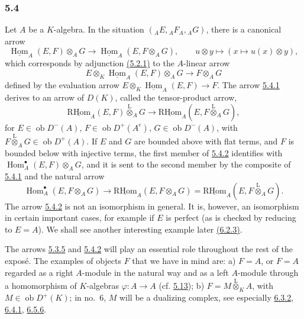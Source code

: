 \documentclass[11pt]{article}
\providecommand{\uHom}{\underline{\Hom}}
\providecommand{\uRHom}{\underline{\RHom}}
\DeclareMathOperator{\Hom}{Hom}
\newcommand{\ob}{\operatorname{ob}}
\providecommand{\RHom}{\mathrm{RHom}}
\providecommand{\lten}{\overset{\mathrm L}{\otimes}}
\providecommand{\RHom}{\mathrm{RHom}}
\providecommand{\Hom}{\operatorname{Hom}}
\providecommand{\ob}{\operatorname{ob}}
\providecommand{\lten}{\overset{\mathrm L}{\otimes}}
\providecommand{\RHom}{\mathrm R\mathcal{H}om}
\providecommand{\lten}{\overset{\mathrm L}{\otimes}}
\providecommand{\lten}{\overset{\mathrm L}{\otimes}}
\providecommand{\lten}{\overset{\mathrm L}{\otimes}}
\providecommand{\lten}{\overset{\mathrm L}{\otimes}}
\providecommand{\RHom}{\mathrm{RHom}}
\providecommand{\Hom}{\operatorname{Hom}}
\providecommand{\lten}{\overset{\mathrm L}{\otimes}}
\begin{document}
\subsubsection*{5.4}\label{sga5:IIIB:subsubsection:5.4}

Let $A$ be a $K$-algebra. In the situation $({}_AE,{}_AF_A,{}_AG)$, there is a canonical arrow
\begin{equation}\tag{5.4.1}\label{sga5:IIIB:equation:5.4.1}
\uHom_A(E,F)\otimes_AG\longrightarrow\uHom_A(E,F\otimes_AG),
\qquad u\otimes y\longmapsto(x\longmapsto u(x)\otimes y),
\end{equation}
which corresponds by adjunction \hyperref[sga5:IIIB:equation:5.2.1]{(5.2.1)} to the $A$-linear arrow
\[
E\otimes_K\uHom_A(E,F)\otimes_AG\longrightarrow F\otimes_AG
\]
defined by the evaluation arrow $E\otimes_K\uHom_A(E,F)\to F$. The arrow \hyperref[sga5:IIIB:equation:5.4.1]{5.4.1} derives to an arrow of $D(K)$, called the tensor-product arrow,
\begin{equation}\tag{5.4.2}\label{sga5:IIIB:equation:5.4.2}
\uRHom_A(E,F)\lten_AG\longrightarrow\uRHom_A(E,F\lten_AG),
\end{equation}
for $E\in\ob D^-(A)$, $F\in\ob D^+(A^e)$, $G\in\ob D^-(A)$, with $F\lten_AG\in\ob D^+(A)$. If $E$ and $G$ are bounded above with flat terms, and $F$ is bounded below with injective terms, the first member of \hyperref[sga5:IIIB:equation:5.4.2]{5.4.2} identifies with $\Hom_A^\bullet(E,F)\otimes_AG$, and it is sent to the second member by the composite of \hyperref[sga5:IIIB:equation:5.4.1]{5.4.1} and the natural arrow
\[
\Hom_A^\bullet(E,F\otimes_AG)\longrightarrow \uRHom_A(E,F\otimes_AG)=\uRHom_A(E,F\lten_AG).
\]
The arrow \hyperref[sga5:IIIB:equation:5.4.2]{5.4.2} is not an isomorphism in general. It is, however, an isomorphism in certain important cases, for example if $E$ is perfect (as is checked by reducing to $E=A$). We shall see another interesting example later \hyperref[sga5:IIIB:equation:6.2.3]{(6.2.3)}.

The arrows \hyperref[sga5:IIIB:equation:5.3.5]{5.3.5} and \hyperref[sga5:IIIB:equation:5.4.2]{5.4.2} will play an essential role throughout the rest of the expos\'e. The examples of objects $F$ that we have in mind are: a) $F=A$, or $F=A$ regarded as a right $A$-module in the natural way and as a left $A$-module through a homomorphism of $K$-algebras $\varphi:A\to A$ (cf. \hyperref[sga5:IIIB:subsubsection:5.13]{5.13}); b) $F=M\lten_KA$, with $M\in\ob D^+(K)$; in no.~6, $M$ will be a dualizing complex, see especially \hyperref[sga5:IIIB:equation:6.3.2]{6.3.2}, \hyperref[sga5:IIIB:equation:6.4.1]{6.4.1}, \hyperref[sga5:IIIB:equation:6.5.6]{6.5.6}.
\end{document}
